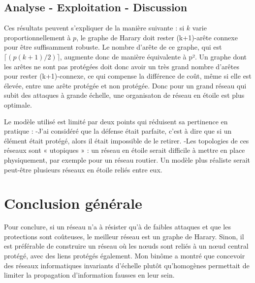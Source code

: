\documentclass[12pt,a4paper]{article}
\begin{document}
\subsection{Analyse - Exploitation - Discussion}
Ces résultats peuvent s'expliquer de la manière suivante : si $k$ varie proportionnellement à $p$, le graphe de Harary doit rester (k+1)-arête connexe pour être suffisamment robuste. Le nombre d'arête de ce graphe, qui est $\lceil (p(k+1)/2) \rceil$, augmente donc de manière équivalente à  p². Un graphe dont les arêtes ne sont pas protégées doit donc avoir un très grand nombre d'arêtes pour rester (k+1)-connexe, ce qui compense la différence de coût, même si elle est élevée, entre une arête protégée et non protégée. Donc pour un grand réseau qui subit des attaques à grande échelle, une organisaton de réseau en étoile est plus optimale.

Le modèle utilisé est limité par deux points qui réduisent sa pertinence en pratique :
	-J'ai considéré que la défense était parfaite, c'est à dire que si un élément était protégé, alors il était impossible de le retirer.
	-Les topologies de ces réseaux sont « utopiques » : un réseau en étoile serait difficile à mettre en place physiquement, par exemple pour un réseau routier. Un modèle plus réaliste serait peut-être plusieurs réseaux en étoile reliés entre eux.
	
\section{Conclusion générale}
Pour conclure, si un réseau n'a à résister qu'à de faibles attaques et que les protections sont coûteuses,  le meilleur réseau est un graphe de Harary. Sinon, il est préférable de construire un réseau où les nœuds sont reliés à un nœud central protégé, avec des liens protégés également. Mon binôme a montré que concevoir des réseaux informatiques invariants d'échelle plutôt qu'homogènes permettait de limiter la propagation d'information fausses en leur sein.
\end{document}
